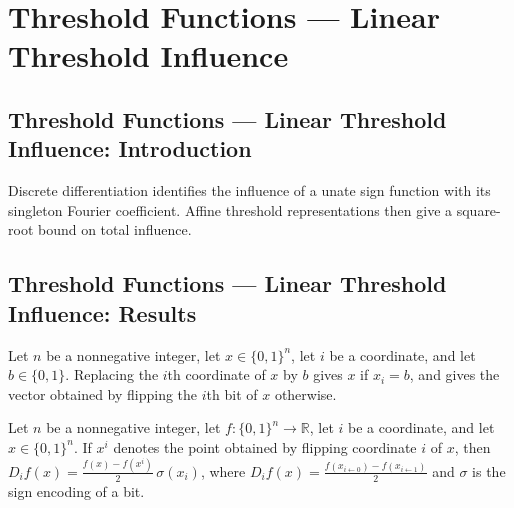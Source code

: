 \section{Threshold Functions --- Linear Threshold Influence}
\subsection*{Threshold Functions --- Linear Threshold Influence: Introduction}
Discrete differentiation identifies the influence of a unate sign function with its singleton Fourier coefficient. Affine threshold representations then give a square-root bound on total influence.

\subsection*{Threshold Functions --- Linear Threshold Influence: Results}

\begin{lemma}
\leanok
{}
Let $n$ be a nonnegative integer, let $x\in\{0,1\}^n$, let $i$ be a coordinate, and let
$b\in\{0,1\}$. Replacing the $i$th coordinate of $x$ by $b$ gives $x$ if $x_i=b$, and
gives the vector obtained by flipping the $i$th bit of $x$ otherwise.
\end{lemma}

\begin{lemma}
\leanok
{}
Let $n$ be a nonnegative integer, let $f:\{0,1\}^n\to\mathbb R$, let $i$ be a
coordinate, and let $x\in\{0,1\}^n$. If $x^i$ denotes the point obtained by flipping
coordinate $i$ of $x$, then $D_i f(x)=\frac{f(x)-f(x^i)}{2}\,\sigma(x_i)$, where $D_i
f(x)=\frac{f(x_{i\leftarrow0})-f(x_{i\leftarrow1})}{2}$ and $\sigma$ is the sign
encoding of a bit.
\end{lemma}

